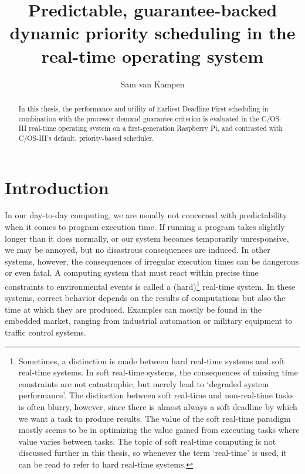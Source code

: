 \documentclass[twoside]{uva-inf-bachelor-thesis}
\title{Predictable, guarantee-backed\\dynamic priority scheduling in the \ucosiii real-time operating system}
\author{Sam van Kampen}
\newcommand{\ucosiii}{\textmu C/OS-III\xspace}
\begin{document}
\maketitle

\begin{abstract}
    In this thesis, the performance and utility of Earliest Deadline First scheduling in combination with the processor demand guarantee criterion is evaluated in the \ucosiii real-time operating system on a first-generation Raspberry Pi, and contrasted with \ucosiii's default, priority-based scheduler.
\end{abstract}


\tableofcontents

%
%
%
%

\chapter{Introduction}
In our day-to-day computing, we are usually not concerned with predictability when it comes to program execution time. If running a program takes slightly longer than it does normally, or our system becomes temporarily unresponsive, we may be annoyed, but no disastrous consequences are induced. In other systems, however, the consequences of irregular execution times can be dangerous or even fatal. A computing system that must react within precise time constraints to environmental events is called a (hard)\footnote{Sometimes, a distinction is made between hard real-time systems and soft real-time systems. In soft real-time systems, the consequences of missing time constraints are not catastrophic, but merely lead to `degraded system performance'. The distinction between soft real-time and non-real-time tasks is often blurry, however, since there is almost always a soft deadline by which we want a task to produce results. The value of the soft real-time paradigm mostly seems to be in optimizing the value gained from executing tasks where value varies between tasks. The topic of soft real-time computing is not discussed further in this thesis, so whenever the term `real-time' is used, it can be read to refer to hard real-time systems.} real-time system\cite{buttazzo2011hard}. In these systems, correct behavior depends on the results of computations but also the time at which they are produced. Examples can mostly be found in the embedded market, ranging from industrial automation or military equipment to traffic control systems.
\end{document}
